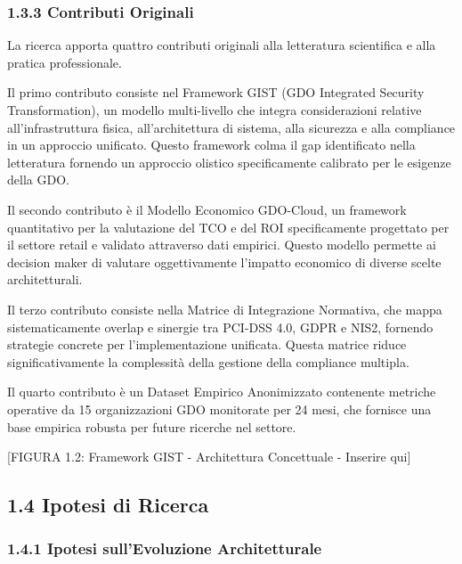 \documentclass{report}
\begin{document}
\subsubsection{\texorpdfstring{\textbf{1.3.3 Contributi
Originali}}{1.3.3 Contributi Originali}}\label{contributi-originali}

La ricerca apporta quattro contributi originali alla letteratura
scientifica e alla pratica professionale.

Il primo contributo consiste nel Framework GIST (GDO Integrated Security
Transformation), un modello multi-livello che integra considerazioni
relative all'infrastruttura fisica, all'architettura di sistema, alla
sicurezza e alla compliance in un approccio unificato. Questo framework
colma il gap identificato nella letteratura fornendo un approccio
olistico specificamente calibrato per le esigenze della GDO.

Il secondo contributo è il Modello Economico GDO-Cloud, un framework
quantitativo per la valutazione del TCO e del ROI specificamente
progettato per il settore retail e validato attraverso dati empirici.
Questo modello permette ai decision maker di valutare oggettivamente
l'impatto economico di diverse scelte architetturali.

Il terzo contributo consiste nella Matrice di Integrazione Normativa,
che mappa sistematicamente overlap e sinergie tra PCI-DSS 4.0, GDPR e
NIS2, fornendo strategie concrete per l'implementazione unificata.
Questa matrice riduce significativamente la complessità della gestione
della compliance multipla.

Il quarto contributo è un Dataset Empirico Anonimizzato contenente
metriche operative da 15 organizzazioni GDO monitorate per 24 mesi, che
fornisce una base empirica robusta per future ricerche nel settore.

{[}FIGURA 1.2: Framework GIST - Architettura Concettuale - Inserire
qui{]}

\subsection{\texorpdfstring{\textbf{1.4 Ipotesi di
Ricerca}}{1.4 Ipotesi di Ricerca}}\label{ipotesi-di-ricerca}

\subsubsection{\texorpdfstring{\textbf{1.4.1 Ipotesi sull'Evoluzione
Architetturale}}{1.4.1 Ipotesi sull'Evoluzione Architetturale}}\label{ipotesi-sullevoluzione-architetturale}
\end{document}
